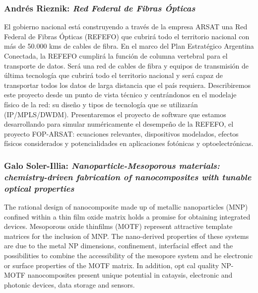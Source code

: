 \subsubsection*{Andr\'es Rieznik: \textit{Red Federal de Fibras \'Opticas}}

El gobierno nacional est\'a construyendo a trav\'es de la empresa ARSAT una Red
Federal de Fibras \'Opticas (REFEFO) que cubrir\'a todo el territorio nacional
con m\'as de 50.000 kms de cables de fibra. En el marco del Plan Estrat\'egico
Argentina Conectada, la REFEFO cumplir\'a la funci\'on de columna vertebral para
el transporte de datos. Ser\'a una red de cables de fibra y equipos de
transmisi\'on de \'ultima tecnolog\'ia que cubrir\'a todo el territorio nacional
y ser\'a capaz de transportar todos los datos de larga distancia que el pa\'is
requiera. Describiremos este proyecto desde un punto de vista t\'ecnico y
centr\'andonos en el modelaje f\'isico de la red: su diseño y tipos de
tecnolog\'ia que se utilizar\'an (IP/MPLS/DWDM). Presentaremos el proyecto de
software que estamos desarrollando para simular num\'ericamente el desempeño de
la REFEFO, el proyecto FOP-ARSAT: ecuaciones relevantes, dispositivos modelados,
efectos f\'isicos considerados y potencialidades en aplicaciones fot\'onicas y
optoelectr\'onicas.

\subsubsection*{Galo Soler-Illia: \textit{Nanoparticle-Mesoporous materials:
chemistry-driven fabrication of nanocomposites with tunable optical properties}}

The rational design of nanocomposite made up of metallic nanoparticles
(MNP) confined within a thin film oxide matrix holds a promise for obtaining
integrated devices. Mesoporous oxide thinfilms (MOTF) represent attractive
template matrices for the inclusion of MNP. The nano-derived properties of these
systems are due to the metal NP dimensions, confinement, interfacial effect
 and the possibilities to combine the accessibility of the mesopore system and 
he electronic or surface properties of the MOTF matrix. In addition,  opt
cal quality NP-MOTF nanocomposites present unique potential in cataysis,
electronic and photonic devices, data storage and sensors.              

